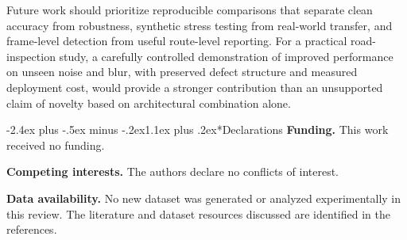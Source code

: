 \documentclass[11pt,a4paper]{article}
\makeatletter
\renewcommand\section{\@startsection{section}{1}{\z@}%
  {-2.4ex plus -.5ex minus -.2ex}{1.1ex plus .2ex}{\normalfont\large\bfseries}}
\makeatother
\begin{document}
Future work should prioritize reproducible comparisons that separate clean accuracy from robustness, synthetic stress testing from real-world transfer, and frame-level detection from useful route-level reporting. For a practical road-inspection study, a carefully controlled demonstration of improved performance on unseen noise and blur, with preserved defect structure and measured deployment cost, would provide a stronger contribution than an unsupported claim of novelty based on architectural combination alone.

\section*{Declarations}
\noindent\textbf{Funding.} This work received no funding.

\noindent\textbf{Competing interests.} The authors declare no conflicts of interest.

\noindent\textbf{Data availability.} No new dataset was generated or analyzed experimentally in this review. The literature and dataset resources discussed are identified in the references.
\end{document}
